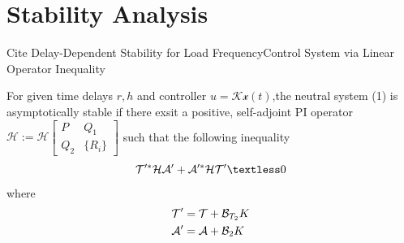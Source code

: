 \documentclass[twocolumn]{autart}    %
\begin{document}
\section{Stability Analysis}
Cite Delay-Dependent Stability for Load FrequencyControl System via Linear Operator Inequality 

\begin{thm}
For given time delays $r,h$ and controller $u = \mathcal{K}\mathcal{x}(t)$,the neutral system (1) is asymptotically stable if there exsit a positive, self-adjoint PI operator $\mathcal{H}:=\mathcal{H}\begin{bmatrix}
    P & Q_{1}\\
    Q_{2} & \{R_{i}\}
\end{bmatrix}$ such that the following inequality
    \begin{equation}
        \begin{aligned}
            \setlength{\arraycolsep}{0.9pt}
            \mathcal{T}'^{*}\mathcal{H}\mathcal{A}'+\mathcal{A}'^{*}\mathcal{H}\mathcal{T}' \textless 0
        \end{aligned}
    \end{equation}
where
\begin{equation}
    \begin{aligned}
        \setlength{\arraycolsep}{0.9pt}
        &\mathcal{T}' = \mathcal{T}+\mathcal{B}_{T_{2}}K\\
        &\mathcal{A}' = \mathcal{A}+\mathcal{B}_{2}K
    \end{aligned}
    \nonumber 
\end{equation}
\end{thm}
\end{document}
